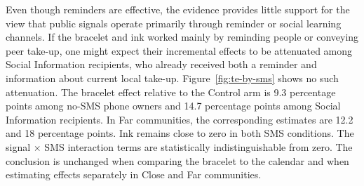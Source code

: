 \documentclass[ECM\space ReStud.tex]{subfiles}
\begin{document}
Even though reminders are effective, the evidence provides little support for the view that public signals operate primarily through reminder or social learning channels. If the bracelet and ink worked mainly by reminding people or conveying peer take-up, one might expect their incremental effects to be attenuated among Social Information recipients, who already received both a reminder and information about current local take-up. Figure~\ref{fig:te-by-sms} shows no such attenuation. The bracelet effect relative to the Control arm is 9.3 percentage points among no-SMS phone owners and 14.7 percentage points among Social Information recipients. In Far communities, the corresponding estimates are 12.2 and 18 percentage points. Ink remains close to zero in both SMS conditions. The signal \(\times\) SMS interaction terms are statistically indistinguishable from zero. The conclusion is unchanged when comparing the bracelet to the calendar and when estimating effects separately in Close and Far communities.

\end{document}
